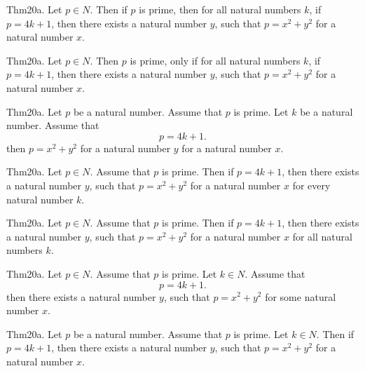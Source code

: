 \documentclass{article}
\begin{document}
Thm20a. Let $p \in N$. Then if $p$ is prime, then for all natural numbers $k$, if $p = 4 k + 1$, then there exists a natural number $y$, such that $p = x ^{ 2}+ y ^{ 2}$ for a natural number $x$.

Thm20a. Let $p \in N$. Then $p$ is prime, only if for all natural numbers $k$, if $p = 4 k + 1$, then there exists a natural number $y$, such that $p = x ^{ 2}+ y ^{ 2}$ for a natural number $x$.

Thm20a. Let $p$ be a natural number. Assume that $p$ is prime. Let $k$ be a natural number. Assume that $$p = 4 k + 1.$$ then $p = x ^{ 2}+ y ^{ 2}$ for a natural number $y$ for a natural number $x$.

Thm20a. Let $p \in N$. Assume that $p$ is prime. Then if $p = 4 k + 1$, then there exists a natural number $y$, such that $p = x ^{ 2}+ y ^{ 2}$ for a natural number $x$ for every natural number $k$.

Thm20a. Let $p \in N$. Assume that $p$ is prime. Then if $p = 4 k + 1$, then there exists a natural number $y$, such that $p = x ^{ 2}+ y ^{ 2}$ for a natural number $x$ for all natural numbers $k$.

Thm20a. Let $p \in N$. Assume that $p$ is prime. Let $k \in N$. Assume that $$p = 4 k + 1.$$ then there exists a natural number $y$, such that $p = x ^{ 2}+ y ^{ 2}$ for some natural number $x$.

Thm20a. Let $p$ be a natural number. Assume that $p$ is prime. Let $k \in N$. Then if $p = 4 k + 1$, then there exists a natural number $y$, such that $p = x ^{ 2}+ y ^{ 2}$ for a natural number $x$.
\end{document}
